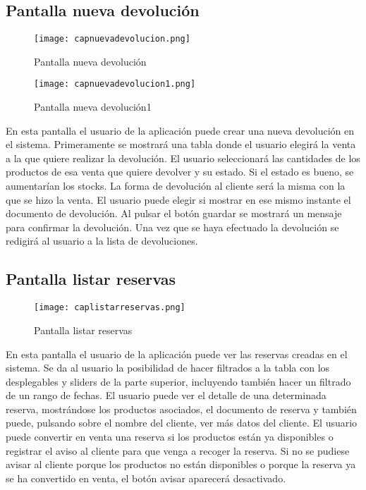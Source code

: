 \newpage
\subsection {Pantalla nueva devolución}

\begin{figure}[!htb]
  \centering
    \texttt{[image: capnuevadevolucion.png]}
  \caption{Pantalla nueva devolución}
  \label{a}
\end{figure}

\begin{figure}[!htb]
  \centering
    \texttt{[image: capnuevadevolucion1.png]}
  \caption{Pantalla nueva devolución1}
  \label{a}
\end{figure}

En esta pantalla el usuario de la aplicación puede crear una nueva devolución en el sistema. Primeramente se mostrará una tabla donde el usuario elegirá la venta a la que quiere realizar la devolución. El usuario seleccionará las cantidades de los productos de esa venta que quiere devolver y su estado. Si el estado es bueno, se aumentarían los stocks. La forma de devolución al cliente será la misma con la que se hizo la venta. El usuario puede elegir si mostrar en ese mismo instante el documento de devolución. Al pulsar el botón guardar se mostrará un mensaje para confirmar la devolución. Una vez que se haya efectuado la devolución se redigirá al usuario a la lista de devoluciones.

\newpage
\subsection {Pantalla listar reservas}

\begin{figure}[!htb]
  \centering
    \texttt{[image: caplistarreservas.png]}
  \caption{Pantalla listar reservas}
  \label{a}
\end{figure}

En esta pantalla el usuario de la aplicación puede ver las reservas creadas en el sistema. Se da al usuario la posibilidad de hacer filtrados a la tabla con los desplegables y sliders de la parte superior, incluyendo también hacer un filtrado de un rango de fechas. El usuario puede ver el detalle de una determinada reserva, mostrándose los productos asociados, el documento de reserva y también puede, pulsando sobre el nombre del cliente, ver más datos del cliente. El usuario puede convertir en venta una reserva si los productos están ya disponibles o registrar el aviso al cliente para que venga a recoger la reserva. Si no se pudiese avisar al cliente porque los productos no están disponibles o porque la reserva ya se ha convertido en venta, el botón avisar aparecerá desactivado.

